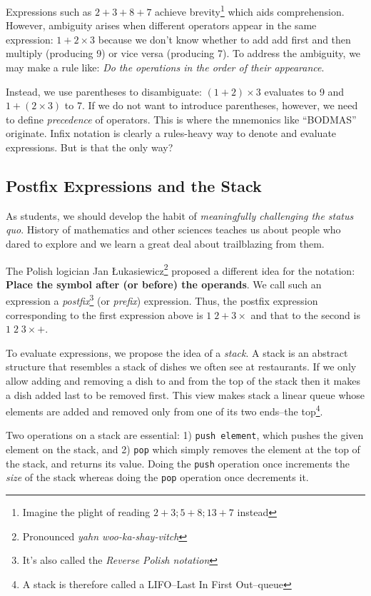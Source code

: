 \documentclass[english,smartquotes]{hgbarticle}
\begin{document}
Expressions such as $2+3+8+7$ achieve brevity\footnote{Imagine the plight of reading $2+3; 5+8; 13+7$ instead} which aids comprehension. However, ambiguity arises when different operators appear in the same expression: $1+2\times 3$ because we don't know whether to add add first and then multiply (producing 9) or vice versa (producing 7). To address the ambiguity, we may make a rule like: \textit{Do the operations in the order of their appearance}.  

Instead, we use parentheses to disambiguate: $(1+2)\times 3$ evaluates to 9 and $1+(2\times 3)$ to 7. If we do not want to introduce parentheses, however, we need to define \textit{precedence} of operators. This is where the mnemonics like ``BODMAS'' originate.  Infix notation is clearly a rules-heavy way to denote and evaluate expressions. But is that the only way?

\subsection{Postfix Expressions and the Stack}
As students, we should develop the habit of \emph{meaningfully challenging the status quo}. History of mathematics and other sciences teaches us about people who dared to explore and we learn a great deal about trailblazing from them.

The Polish logician Jan Łukasiewicz\footnote{Pronounced \textit{yahn woo-ka-shay-vitch}} proposed a different idea for the notation\cite{Hamblin1962}: \textbf{Place the symbol after (or before) the operands}. We call such an expression a \emph{postfix}\footnote{It's also called the \emph{Reverse Polish notation}} (or \emph{prefix}) expression. Thus, the postfix expression corresponding to the first expression above is $1\;2 + 3\times$ and that to the second is $1\;2\;3\times +$. 

To evaluate expressions, we propose the idea of a \emph{stack}. A stack is an abstract structure that resembles a stack of dishes we often see at restaurants. If we only allow adding and removing a dish to and from the top of the stack then it makes a dish added last to be removed first. This view makes stack a linear queue whose elements are added and removed only from one of its two ends--the top\footnote{A stack is therefore called a LIFO--Last In First Out--queue}. 

Two operations on a stack are essential: 1) \texttt{push element}, which pushes the given element on the stack, and 2) \texttt{pop} which simply removes the element at the top of the stack, and returns its value. Doing the \texttt{push} operation once increments the \emph{size} of the stack whereas doing the \texttt{pop} operation once decrements it.
\end{document}
